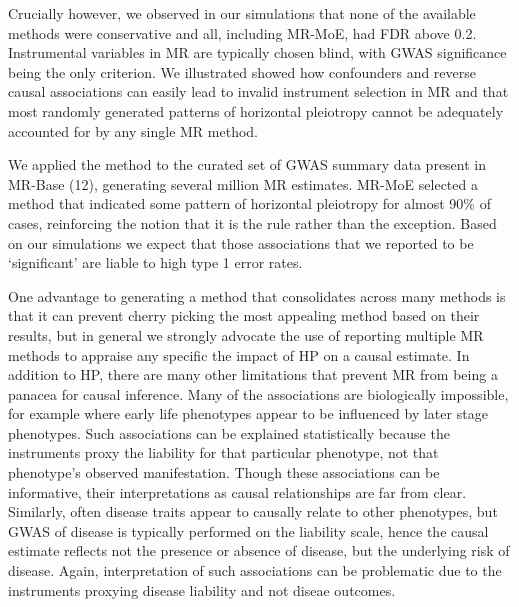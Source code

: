 \documentclass[]{article}
\begin{document}
Crucially however, we observed in our simulations that none of the
available methods were conservative and all, including MR-MoE, had FDR
above 0.2. Instrumental variables in MR are typically chosen blind, with
GWAS significance being the only criterion. We illustrated showed how
confounders and reverse causal associations can easily lead to invalid
instrument selection in MR and that most randomly generated patterns of
horizontal pleiotropy cannot be adequately accounted for by any single
MR method.

We applied the method to the curated set of GWAS summary data present in
MR-Base (12), generating several million MR estimates. MR-MoE selected a
method that indicated some pattern of horizontal pleiotropy for almost
90\% of cases, reinforcing the notion that it is the rule rather than
the exception. Based on our simulations we expect that those
associations that we reported to be `significant' are liable to high
type 1 error rates.

One advantage to generating a method that consolidates across many
methods is that it can prevent cherry picking the most appealing method
based on their results, but in general we strongly advocate the use of
reporting multiple MR methods to appraise any specific the impact of HP
on a causal estimate. In addition to HP, there are many other
limitations that prevent MR from being a panacea for causal inference.
Many of the associations are biologically impossible, for example where
early life phenotypes appear to be influenced by later stage phenotypes.
Such associations can be explained statistically because the instruments
proxy the liability for that particular phenotype, not that phenotype's
observed manifestation. Though these associations can be informative,
their interpretations as causal relationships are far from clear.
Similarly, often disease traits appear to causally relate to other
phenotypes, but GWAS of disease is typically performed on the liability
scale, hence the causal estimate reflects not the presence or absence of
disease, but the underlying risk of disease. Again, interpretation of
such associations can be problematic due to the instruments proxying
disease liability and not diseae outcomes.
\end{document}
